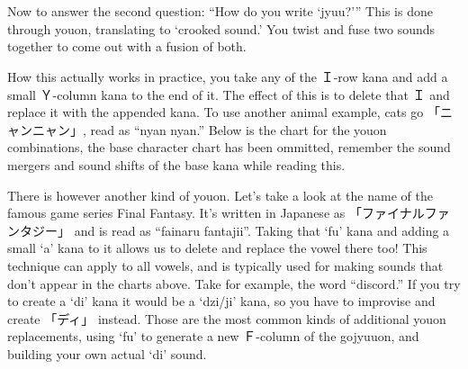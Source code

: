 \section[拗音]{}\label{sec:PR仮名拗音}

Now to answer the second question: ``How do you write `jyuu?''' This is done through youon, translating to `crooked sound.' You twist and fuse two sounds together to come out with a fusion of both.

How this actually works in practice, you take any of the Ｉ-row kana and add a small Ｙ-column kana to the end of it. The effect of this is to delete that Ｉ and replace it with the appended kana. To use another animal example, cats go 「ニャンニャン」, read as ``nyan nyan.'' Below is the chart for the youon combinations, the base character chart has been ommitted, remember the sound mergers and sound shifts of the base kana while reading this.





There is however another kind of youon. Let's take a look at the name of the famous game series Final Fantasy. It's written in Japanese as 「ファイナルファンタジー」 and is read as ``fainaru fantajii''. Taking that `fu' kana and adding a small `a' kana to it allows us to delete and replace the vowel there too! This technique can apply to all vowels, and is typically used for making sounds that don't appear in the charts above. Take for example, the word ``discord.'' If you try to create a `di' kana it would be a `dzi/ji' kana, so you have to improvise and create 「ディ」 instead. Those are the most common kinds of additional youon replacements, using `fu' to generate a new Ｆ-column of the gojyuuon, and building your own actual `di' sound.